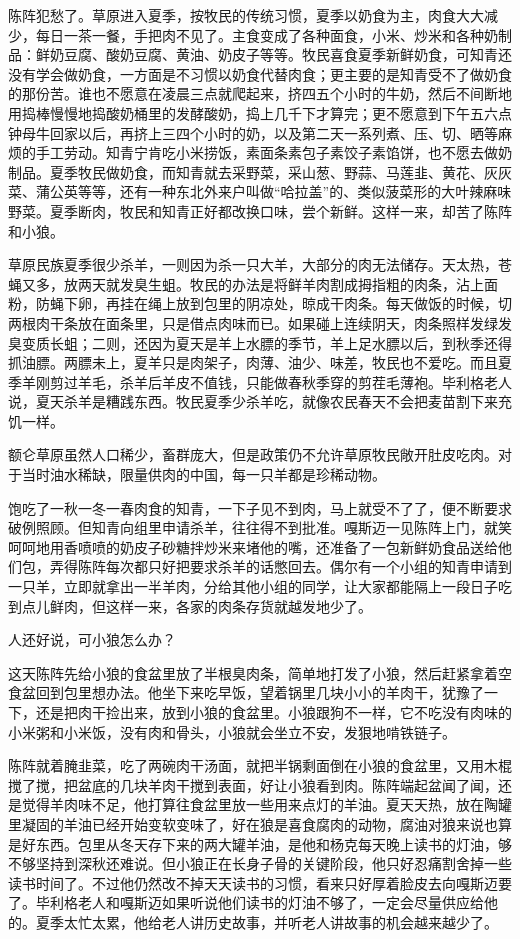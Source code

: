 \par 陈阵犯愁了。草原进入夏季，按牧民的传统习惯，夏季以奶食为主，肉食大大减少，每日一茶一餐，手把肉不见了。主食变成了各种面食，小米、炒米和各种奶制品：鲜奶豆腐、酸奶豆腐、黄油、奶皮子等等。牧民喜食夏季新鲜奶食，可知青还没有学会做奶食，一方面是不习惯以奶食代替肉食；更主要的是知青受不了做奶食的那份苦。谁也不愿意在凌晨三点就爬起来，挤四五个小时的牛奶，然后不间断地用捣棒慢慢地捣酸奶桶里的发酵酸奶，捣上几千下才算完；更不愿意到下午五六点钟母牛回家以后，再挤上三四个小时的奶，以及第二天一系列煮、压、切、晒等麻烦的手工劳动。知青宁肯吃小米捞饭，素面条素包子素饺子素馅饼，也不愿去做奶制品。夏季牧民做奶食，而知青就去采野菜，采山葱、野蒜、马莲韭、黄花、灰灰菜、蒲公英等等，还有一种东北外来户叫做“哈拉盖”的、类似菠菜形的大叶辣麻味野菜。夏季断肉，牧民和知青正好都改换口味，尝个新鲜。这样一来，却苦了陈阵和小狼。
\par 草原民族夏季很少杀羊，一则因为杀一只大羊，大部分的肉无法储存。天太热，苍蝇又多，放两天就发臭生蛆。牧民的办法是将鲜羊肉割成拇指粗的肉条，沾上面粉，防蝇下卵，再挂在绳上放到包里的阴凉处，晾成干肉条。每天做饭的时候，切两根肉干条放在面条里，只是借点肉味而已。如果碰上连续阴天，肉条照样发绿发臭变质长蛆；二则，还因为夏天是羊上水膘的季节，羊上足水膘以后，到秋季还得抓油膘。两膘未上，夏羊只是肉架子，肉薄、油少、味差，牧民也不爱吃。而且夏季羊刚剪过羊毛，杀羊后羊皮不值钱，只能做春秋季穿的剪茬毛薄袍。毕利格老人说，夏天杀羊是糟践东西。牧民夏季少杀羊吃，就像农民春天不会把麦苗割下来充饥一样。
\par 额仑草原虽然人口稀少，畜群庞大，但是政策仍不允许草原牧民敞开肚皮吃肉。对于当时油水稀缺，限量供肉的中国，每一只羊都是珍稀动物。
\par 饱吃了一秋一冬一春肉食的知青，一下子见不到肉，马上就受不了了，便不断要求破例照顾。但知青向组里申请杀羊，往往得不到批准。嘎斯迈一见陈阵上门，就笑呵呵地用香喷喷的奶皮子砂糖拌炒米来堵他的嘴，还准备了一包新鲜奶食品送给他们包，弄得陈阵每次都只好把要求杀羊的话憋回去。偶尔有一个小组的知青申请到一只羊，立即就拿出一半羊肉，分给其他小组的同学，让大家都能隔上一段日子吃到点儿鲜肉，但这样一来，各家的肉条存货就越发地少了。
\par 人还好说，可小狼怎么办？
\par 这天陈阵先给小狼的食盆里放了半根臭肉条，简单地打发了小狼，然后赶紧拿着空食盆回到包里想办法。他坐下来吃早饭，望着锅里几块小小的羊肉干，犹豫了一下，还是把肉干捡出来，放到小狼的食盆里。小狼跟狗不一样，它不吃没有肉味的小米粥和小米饭，没有肉和骨头，小狼就会坐立不安，发狠地啃铁链子。
\par 陈阵就着腌韭菜，吃了两碗肉干汤面，就把半锅剩面倒在小狼的食盆里，又用木棍搅了搅，把盆底的几块羊肉干搅到表面，好让小狼看到肉。陈阵端起盆闻了闻，还是觉得羊肉味不足，他打算往食盆里放一些用来点灯的羊油。夏天天热，放在陶罐里凝固的羊油已经开始变软变味了，好在狼是喜食腐肉的动物，腐油对狼来说也算是好东西。包里从冬天存下来的两大罐羊油，是他和杨克每天晚上读书的灯油，够不够坚持到深秋还难说。但小狼正在长身子骨的关键阶段，他只好忍痛割舍掉一些读书时间了。不过他仍然改不掉天天读书的习惯，看来只好厚着脸皮去向嘎斯迈要了。毕利格老人和嘎斯迈如果听说他们读书的灯油不够了，一定会尽量供应给他的。夏季太忙太累，他给老人讲历史故事，并听老人讲故事的机会越来越少了。
